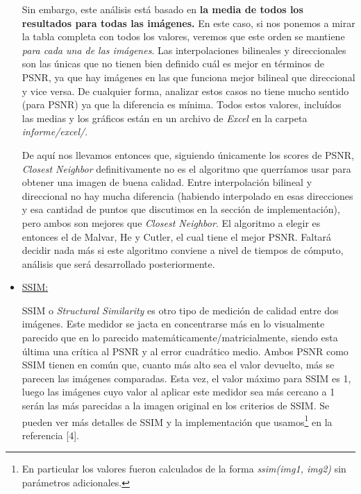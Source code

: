 \begin{itemize}
\vspace{\baselineskip}

Sin embargo, este análisis está basado en \textbf{la media de todos los resultados para todas las imágenes.} En este caso, si nos ponemos a mirar la tabla completa con todos los valores, veremos que este orden se mantiene \textit{para cada una de las imágenes}. Las interpolaciones bilineales y direccionales son las únicas que no tienen bien definido cuál es mejor en términos de PSNR, ya que hay imágenes en las que funciona mejor bilineal que direccional y vice versa. De cualquier forma, analizar estos casos no tiene mucho sentido (para PSNR) ya que la diferencia es mínima. Todos estos valores, incluídos las medias y los gráficos están en un archivo de \textit{Excel} en la carpeta \textit{informe/excel/}.

\vspace{\baselineskip}

De aquí nos llevamos entonces que, siguiendo únicamente los scores de PSNR, \textit{Closest Neighbor} definitivamente no es el algoritmo que querríamos usar para obtener una imagen de buena calidad. Entre interpolación bilineal y direccional no hay mucha diferencia (habiendo interpolado en esas direcciones y esa cantidad de puntos que discutimos en la sección de implementación), pero ambos son mejores que \textit{Closest Neighbor}. El algoritmo a elegir es entonces el de Malvar, He y Cutler, el cual tiene el mejor PSNR. Faltará decidir nada más si este algoritmo conviene a nivel de tiempos de cómputo, análisis que será desarrollado posteriormente.

\item \underline{SSIM:}

SSIM o \textit{Structural Similarity} es otro tipo de medición de calidad entre dos imágenes. Este medidor se jacta en concentrarse más en lo visualmente parecido que en lo parecido matemáticamente/matricialmente, siendo esta última una crítica al PSNR y al error cuadrático medio. Ambos PSNR como SSIM tienen en común que, cuanto más alto sea el valor devuelto, más se parecen las imágenes comparadas. Esta vez, el valor máximo para SSIM es 1, luego las imágenes cuyo valor al aplicar este medidor sea más cercano a 1 serán las más parecidas a la imagen original en los criterios de SSIM. Se pueden ver más detalles de SSIM y la implementación que usamos\footnote{En particular los valores fueron calculados de la forma \textit{ssim(img1, img2)} sin parámetros adicionales.} en la referencia [4]. 


\end{itemize}
